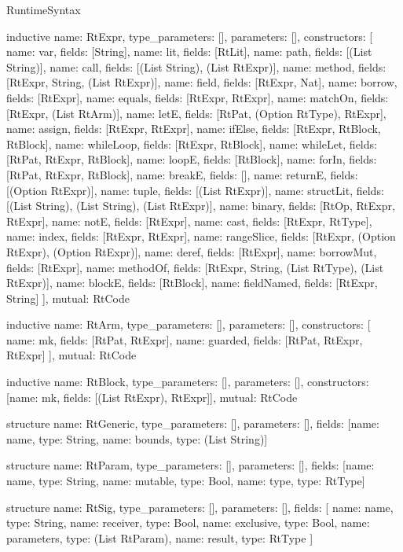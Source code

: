 \begin{lexlean}{RuntimeSyntax}
\begin{semanticmodule}
inductive{
  name: RtExpr,
  type_parameters: [],
  parameters: [],
  constructors: [
    {name: var, fields: [String]},
    {name: lit, fields: [RtLit]},
    {name: path, fields: [(List String)]},
    {name: call, fields: [(List String), (List RtExpr)]},
    {name: method, fields: [RtExpr, String, (List RtExpr)]},
    {name: field, fields: [RtExpr, Nat]},
    {name: borrow, fields: [RtExpr]},
    {name: equals, fields: [RtExpr, RtExpr]},
    {name: matchOn, fields: [RtExpr, (List RtArm)]},
    {name: letE, fields: [RtPat, (Option RtType), RtExpr]},
    {name: assign, fields: [RtExpr, RtExpr]},
    {name: ifElse, fields: [RtExpr, RtBlock, RtBlock]},
    {name: whileLoop, fields: [RtExpr, RtBlock]},
    {name: whileLet, fields: [RtPat, RtExpr, RtBlock]},
    {name: loopE, fields: [RtBlock]},
    {name: forIn, fields: [RtPat, RtExpr, RtBlock]},
    {name: breakE, fields: []},
    {name: returnE, fields: [(Option RtExpr)]},
    {name: tuple, fields: [(List RtExpr)]},
    {name: structLit, fields: [(List String), (List String), (List RtExpr)]},
    {name: binary, fields: [RtOp, RtExpr, RtExpr]},
    {name: notE, fields: [RtExpr]},
    {name: cast, fields: [RtExpr, RtType]},
    {name: index, fields: [RtExpr, RtExpr]},
    {name: rangeSlice, fields: [RtExpr, (Option RtExpr), (Option RtExpr)]},
    {name: deref, fields: [RtExpr]},
    {name: borrowMut, fields: [RtExpr]},
    {name: methodOf, fields: [RtExpr, String, (List RtType), (List RtExpr)]},
    {name: blockE, fields: [RtBlock]},
    {name: fieldNamed, fields: [RtExpr, String]}
  ],
  mutual: RtCode
}

inductive{
  name: RtArm,
  type_parameters: [],
  parameters: [],
  constructors: [
    {name: mk, fields: [RtPat, RtExpr]},
    {name: guarded, fields: [RtPat, RtExpr, RtExpr]}
  ],
  mutual: RtCode
}

inductive{
  name: RtBlock,
  type_parameters: [],
  parameters: [],
  constructors: [{name: mk, fields: [(List RtExpr), RtExpr]}],
  mutual: RtCode
}

structure{
  name: RtGeneric,
  type_parameters: [],
  parameters: [],
  fields: [{name: name, type: String}, {name: bounds, type: (List String)}]
}

structure{
  name: RtParam,
  type_parameters: [],
  parameters: [],
  fields: [{name: name, type: String}, {name: mutable, type: Bool}, {name: type, type: RtType}]
}

structure{
  name: RtSig,
  type_parameters: [],
  parameters: [],
  fields: [
    {name: name, type: String},
    {name: receiver, type: Bool},
    {name: exclusive, type: Bool},
    {name: parameters, type: (List RtParam)},
    {name: result, type: RtType}
  ]
}


\end{semanticmodule}
\end{lexlean}
